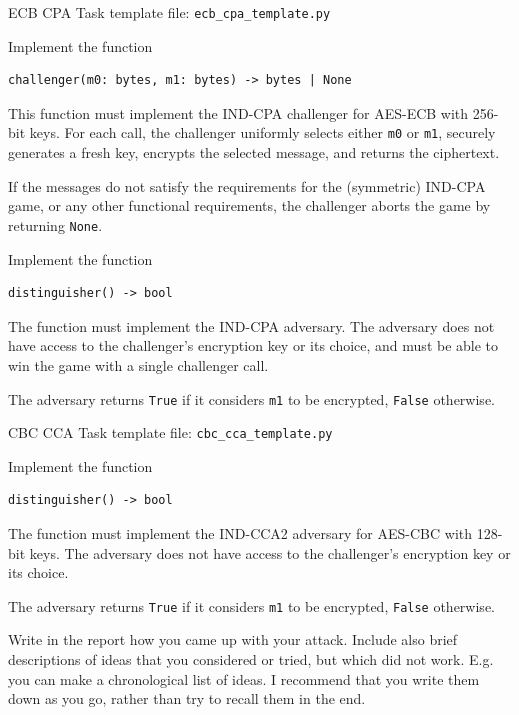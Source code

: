 \documentclass{homework}
\begin{document}
\begin{task}{ECB CPA}
  Task template file: \texttt{ecb\_cpa\_template.py}

  Implement the function
  \begin{Verbatim}
challenger(m0: bytes, m1: bytes) -> bytes | None
  \end{Verbatim}
  This function must implement the IND-CPA challenger for AES-ECB with 256-bit keys.
  For each call, the challenger uniformly selects either \texttt{m0} or \texttt{m1}, securely generates a fresh key, encrypts the selected message, and returns the ciphertext.

  If the messages do not satisfy the requirements for the (symmetric) IND-CPA game, or any other functional requirements, the challenger aborts the game by returning \texttt{None}.

  Implement the function
  \begin{Verbatim}
distinguisher() -> bool
  \end{Verbatim}

  The function must implement the IND-CPA adversary.
  The adversary does not have access to the challenger's encryption key or its choice, and must be able to win the game with a single challenger call.
  
  The adversary returns \texttt{True} if it considers \texttt{m1} to be encrypted, \texttt{False} otherwise.
\end{task}

\newpage

\begin{task}{CBC CCA}
  Task template file: \texttt{cbc\_cca\_template.py}

  Implement the function
  \begin{Verbatim}
distinguisher() -> bool
  \end{Verbatim}

  The function must implement the IND-CCA2 adversary for AES-CBC with 128-bit keys.
  The adversary does not have access to the challenger's encryption key or its choice.
  
  The adversary returns \texttt{True} if it considers \texttt{m1} to be encrypted, \texttt{False} otherwise.

  Write in the report how you came up with your attack.
  Include also brief descriptions of ideas that you considered or tried, but which did not work.
  E.g. you can make a chronological list of ideas.
  I recommend that you write them down as you go, rather than try to recall them in the end.
\end{task}
\end{document}
